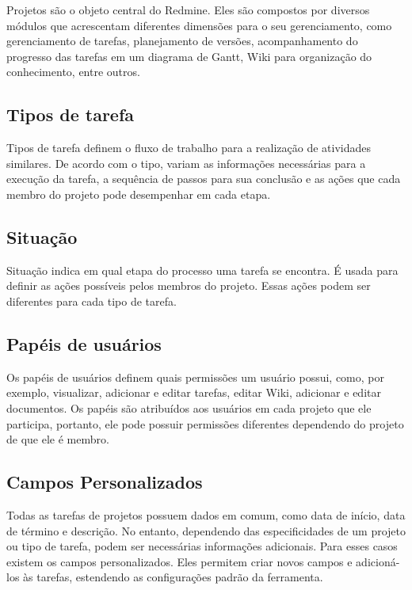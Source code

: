 Projetos são o objeto central do Redmine. Eles são compostos por diversos módulos que acrescentam diferentes dimensões para o seu gerenciamento, como gerenciamento de tarefas, planejamento de versões, acompanhamento do progresso das tarefas em um diagrama de Gantt, Wiki para organização do conhecimento, entre outros. 

\subsection{Tipos de tarefa}\label{subsection:redmine-estrutura_basica-tracker}

Tipos de tarefa definem o fluxo de trabalho para a realização de atividades similares. De acordo com o tipo, variam as informações necessárias para a execução da tarefa, a sequência de passos para sua conclusão e as ações que cada membro do projeto pode desempenhar em cada etapa.

\subsection{Situação}\label{subsection:redmine-estrutura_basica-status}

Situação indica em qual etapa do processo uma tarefa se encontra. É usada para definir as ações possíveis pelos membros do projeto. Essas ações podem ser diferentes para cada tipo de tarefa.

\subsection{Papéis de usuários}\label{subsection:redmine-estrutura_basica-role}

Os papéis de usuários definem quais permissões um usuário possui, como, por exemplo, visualizar, adicionar e editar tarefas, editar Wiki, adicionar e editar documentos. Os papéis são atribuídos aos usuários em cada projeto que ele participa, portanto, ele pode possuir permissões diferentes dependendo do projeto de que ele é membro.

\subsection{Campos Personalizados}\label{subsection:redmine-estrutura_basica-custom_fields}

Todas as tarefas de projetos possuem dados em comum, como data de início, data de término e descrição. No entanto, dependendo das especificidades de um projeto ou tipo de tarefa, podem ser necessárias informações adicionais. Para esses casos existem os campos personalizados. Eles permitem criar novos campos e adicioná-los às tarefas, estendendo as configurações padrão da ferramenta.

